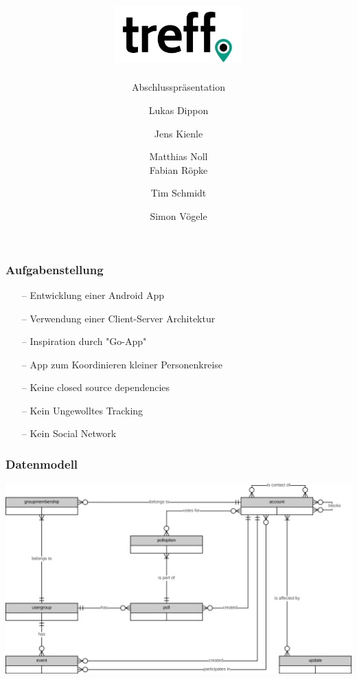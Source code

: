 \documentclass[aspectratio=1610]{beamer}
\title{\includegraphics[width = 50mm]{images/logo_crop.png}}
\subtitle{\huge Abschlusspräsentation}
\author{Lukas Dippon
	\and Jens Kienle
	\and Matthias Noll
    \\Fabian Röpke
	\and Tim Schmidt
	\and Simon Vögele}
\begin{document}
	\begin{frame}[plain]
	\maketitle
	\end{frame}


	\begin{frame}[plain]
      \frametitle{\textbf{Aufgabenstellung}}
      \begin{itemize}
        \item[--] Entwicklung einer Android App
        \item[--] Verwendung einer Client-Server Architektur
        \item[--] Inspiration durch "Go-App"
        \item[--] App zum Koordinieren kleiner Personenkreise
        \item[--] Keine closed source dependencies
        \item[--] Kein Ungewolltes Tracking
        \item[--] Kein Social Network
      \end{itemize}
  \end{frame}

  \begin{frame}[plain]
      \frametitle{\textbf{Datenmodell}}
      \includegraphics[width = \columnwidth - 30pt]
        {images/erd.png}
  \end{frame}

\end{document}
